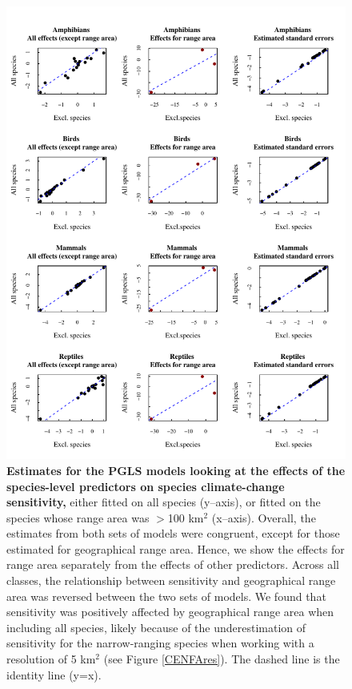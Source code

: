 \documentclass[11pt]{article}
\begin{document}
\begin{figure}[h!]
\centering
\includegraphics[scale=0.9]{Figures/ClimateChangeModelsEstimates.pdf}
\caption[]{\textbf{Estimates for the PGLS models looking at the effects of the species-level predictors on species climate-change sensitivity,} either fitted on all species (y--axis), or fitted on the species whose range area was $>$100 km$^2$ (x--axis). Overall, the estimates from both sets of models were congruent, except for those estimated for geographical range area. Hence, we show the effects for range area separately from the effects of other predictors. Across all classes, the relationship between sensitivity and geographical range area was reversed between the two sets of models. We found that sensitivity was positively affected by geographical range area when including all species, likely because of the underestimation of sensitivity for the narrow-ranging species when working with a resolution of 5 km$^2$ (see Figure \ref{CENFAres}). The dashed line is the identity line (y=x).}
\label{}
\end{figure}
\end{document}
